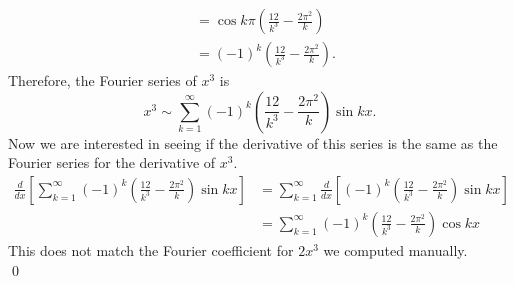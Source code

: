 \documentclass[10pt]{amsart}
\theoremstyle{nonumberplain}
\begin{document}
\begin{enumerate}[label={\bf {\arabic*}:}]
\begin{itemize}
\begin{align*}
&= \cos k \pi \left( \frac{12}{k^3} - \frac {2 \pi^2} k \right)  \\
&= (-1)^k \left( \frac{12}{k^3} - \frac {2 \pi^2} k \right).
\end{align*}
Therefore, the Fourier series of $x^3$ is
$$
x^3 \sim \sum_{k=1}^{\infty} (-1)^k \left( \frac{12}{k^3} - \frac {2 \pi^2} k \right) \sin k x.
$$
Now we are interested in seeing if the derivative of this series is the same as the Fourier series for the derivative of $x^3$.
\begin{align*}
\frac d {dx} \left [ \sum_{k=1}^{\infty} (-1)^k \left( \frac{12}{k^3} - \frac {2 \pi^2} k \right) \sin k x \right]
&=  \sum_{k=1}^{\infty} \frac d {dx} \left [ (-1)^k \left( \frac{12}{k^3} - \frac {2 \pi^2} k \right) \sin k x \right] \\
&=  \sum_{k=1}^{\infty} (-1)^k \left( \frac{12}{k^3} - \frac {2 \pi^2} k \right) \cos k x 
\end{align*}
This does not match the Fourier coefficient for $2x^3$ we computed manually. \\
\qed \\
\newpage


\end{itemize}
\end{enumerate}
\end{document}
